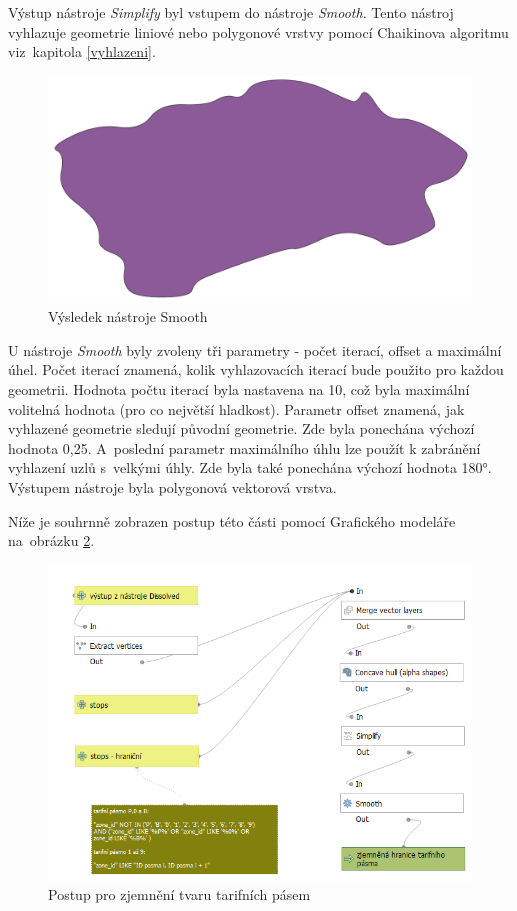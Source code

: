 Výstup nástroje \textit{Simplify} byl vstupem do nástroje \textit{Smooth}. Tento nástroj vy\-hlazuje geometrie
liniové nebo polygonové vrstvy pomocí Chaikinova algoritmu viz~ka\-pitola \ref{vyhlazeni}.

\begin{figure}[H] \centering
    \includegraphics[width=400pt]{./pictures/smooth-P0B.png}
    \caption[Výsledek nástroje Smooth]{Výsledek nástroje Smooth}
	\label{fig:smooth-P0B}                                
\end{figure}

U nástroje \textit{Smooth} byly zvoleny tři parametry - počet iterací, offset a maximální úhel.
Počet iterací znamená, kolik vyhlazovacích iterací bude použito pro každou geometrii.
Hodnota počtu iterací byla nastavena na 10, což byla maximální volitelná hodnota (pro co největší hladkost).
Parametr offset znamená, jak  vyhlazené geometrie sledují původní geometrie.
Zde byla ponechána výchozí hodnota 0,25. A~poslední parametr maximálního úhlu lze použít
k zabránění vyhlazení uzlů s~velkými úhly. Zde byla také ponechána výchozí hodnota 180°.
Výstupem nástroje byla polygonová vektorová vrstva.

Níže je souhrnně zobrazen postup této části pomocí Grafického modeláře na~obrá\-zku \ref{fig:postup-smooth}.

\begin{figure}[H] \centering
    \includegraphics[width=400pt]{./pictures/postup-smooth.png}
    \caption[Postup pro zjemnění tvaru tarifních pásem]{Postup pro zjemnění tvaru tarifních pásem}
	\label{fig:postup-smooth}              
\end{figure}

